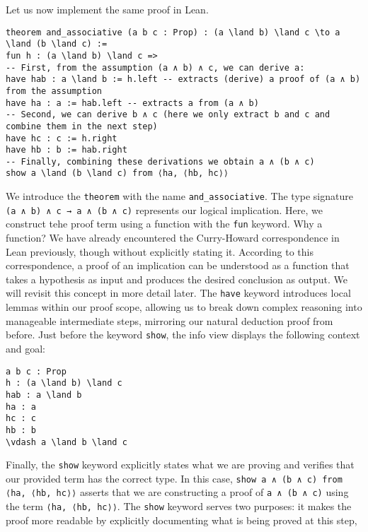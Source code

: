 \begin{example}
  Let us now implement the same proof in Lean.
  \begin{lstlisting}[language=lean]
theorem and_associative (a b c : Prop) : (a \land b) \land c \to a \land (b \land c) :=
fun h : (a \land b) \land c =>
-- First, from the assumption (a ∧ b) ∧ c, we can derive a:
have hab : a \land b := h.left -- extracts (derive) a proof of (a ∧ b) from the assumption
have ha : a := hab.left -- extracts a from (a ∧ b)
-- Second, we can derive b ∧ c (here we only extract b and c and combine them in the next step)
have hc : c := h.right
have hb : b := hab.right
-- Finally, combining these derivations we obtain a ∧ (b ∧ c)
show a \land (b \land c) from ⟨ha, ⟨hb, hc⟩⟩
\end{lstlisting}
  We introduce the \lstinline[language=lean]|theorem| with the name
  \lstinline[language=lean]|and_associative|.
  The type signature \lstinline[language=lean]|(a ∧ b) ∧ c → a ∧ (b ∧ c)|
  represents our logical implication.
  Here, we construct tehe proof term using a function with the \lstinline[language=lean]|fun| keyword.
  Why a function? We have already encountered the Curry-Howard correspondence in Lean
  previously, though without explicitly stating it.
  According to this correspondence, a proof of an implication can be
  understood as a function that takes a hypothesis as input and produces
  the desired conclusion as output. We will revisit this concept in more
  detail later.
  The \lstinline[language=lean]|have| keyword introduces local
  lemmas within our proof scope, allowing us to break down complex
  reasoning into manageable intermediate steps, mirroring our natural deduction proof from before.
  Just before the keyword \lstinline[language=lean]|show|, the info view displays the following
  context and goal:
  \begin{lstlisting}[language=lean]
a b c : Prop
h : (a \land b) \land c
hab : a \land b
ha : a
hc : c
hb : b
\vdash a \land b \land c
\end{lstlisting}
  Finally, the \lstinline[language=lean]|show| keyword explicitly states what
  we are proving and verifies that our provided term has the correct type.
  In this case, \lstinline[language=lean]|show a ∧ (b ∧ c) from ⟨ha, ⟨hb, hc⟩⟩|
  asserts that we are constructing a proof of \lstinline[language=lean]|a ∧ (b ∧ c)|
  using the term \lstinline[language=lean]|⟨ha, ⟨hb, hc⟩⟩|.
  The \lstinline[language=lean]|show| keyword serves two purposes:
  it makes the proof more readable by explicitly documenting what is being proved at this step,

\end{example}
